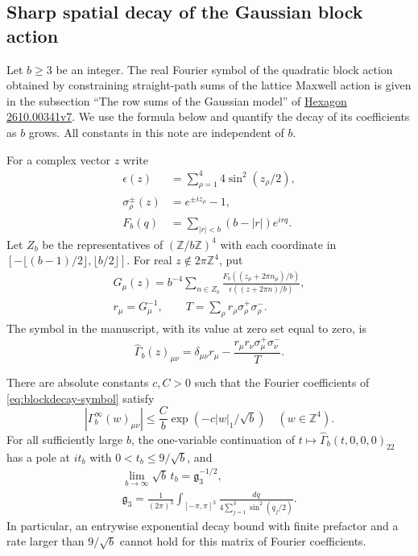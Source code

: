 \subsection{Sharp spatial decay of the Gaussian block action}\label{ssec:blockdecay}

Let $b\ge3$ be an integer. The real Fourier symbol of the quadratic block
action obtained by constraining straight-path sums of the lattice Maxwell
action is given in the subsection ``The row sums of the Gaussian model'' of
\href{https://hexagonmath.org/2610.00341v7}{Hexagon 2610.00341v7}.
We use the formula below and quantify the decay of its coefficients as $b$
grows. All constants in this note are independent of $b$.

For a complex vector $z$ write
\begin{align*}
 \epsilon(z)&=\sum_{\rho=1}^4 4\sin^2(z_\rho/2),\\
 \sigma_\rho^\pm(z)&=e^{\pm iz_\rho}-1,\\
 F_b(q)&=\sum_{|r|<b}(b-|r|)e^{irq}.
\end{align*}
Let $Z_b$ be the representatives of $(\mathbb Z/b\mathbb Z)^4$ with each
coordinate in $[-\lfloor(b-1)/2\rfloor,\lfloor b/2\rfloor]$.
For real $z\notin 2\pi\mathbb Z^4$, put
\begin{gather*}
 G_\mu(z)=b^{-4}\sum_{n\in Z_b}
     \frac{F_b((z_\mu+2\pi n_\mu)/b)}{\epsilon((z+2\pi n)/b)},\\
 r_\mu=G_\mu^{-1},\qquad T=\sum_\rho r_\rho\sigma_\rho^+\sigma_\rho^- .
\end{gather*}
The symbol in the manuscript, with its value at zero set equal to zero, is
\begin{equation}\label{eq:blockdecay-symbol}
 \widehat\Gamma_b(z)_{\mu\nu}
 =\delta_{\mu\nu}r_\mu-
   \frac{r_\mu r_\nu\sigma_\mu^+\sigma_\nu^-}{T}.
\end{equation}

\begin{theorem}\label{thm:blockdecay}
There are absolute constants $c,C>0$ such that the Fourier coefficients of
\eqref{eq:blockdecay-symbol} satisfy
\[
 |\Gamma_b^\infty(w)_{\mu\nu}|\le \frac Cb
       \exp\left(-c|w|_1/\sqrt b\right)
 \quad (w\in\mathbb Z^4).
\]
For all sufficiently large $b$, the one-variable continuation of
$t\mapsto\widehat\Gamma_b(t,0,0,0)_{22}$ has a pole at $i t_b$ with
$0<t_b\le 9/\sqrt b$, and
\begin{gather*}
 \lim_{b\to\infty}\sqrt b\,t_b=\mathfrak g_3^{-1/2},\\
 \mathfrak g_3=\frac{1}{(2\pi)^3}\int_{[-\pi,\pi]^3}
           \frac{dq}{4\sum_{j=1}^3\sin^2(q_j/2)}.
\end{gather*}
In particular, an entrywise exponential decay bound
with finite prefactor and a rate larger than $9/\sqrt b$ cannot hold for this
matrix of Fourier coefficients.
\end{theorem}


